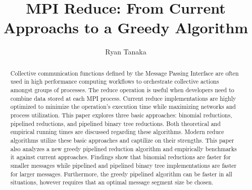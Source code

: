 \documentclass{article}
\begin{document}
\title{MPI Reduce: From Current Approachs to a Greedy Algorithm}
\author{Ryan Tanaka}

\maketitle

\begin{abstract}
Collective communication functions defined by the Message Passing Interface are often used in high 
performance computing workflows to orchestrate collective actions amongst groups of processes.
The reduce operation is useful when developers need to combine data stored at each MPI process. 
Current reduce implementations are highly optimized to minimize the operation's execution time 
while maximizing networks and process utilization. This paper explores three basic approaches: 
binomial reductions, pipelined reductions, and pipelined binary tree reductions. Both theoretical 
and empirical running times are discussed regarding these algorithms. Modern reduce algorithms 
utilize these basic approaches and captilize on their strengths. This paper also analyzes a new 
greedy pipelined reduction algorithm and empirically benchmarks it against current approaches. 
Findings show that binomial reductions are faster for smaller messages while pipelined and pipelined
binary tree implementations are faster for larger messages. Furthermore, the greedy pipelined 
algorithm can be faster in all situations, however requires that an optimal message segment size
be chosen.
\end{abstract}
\end{document}
